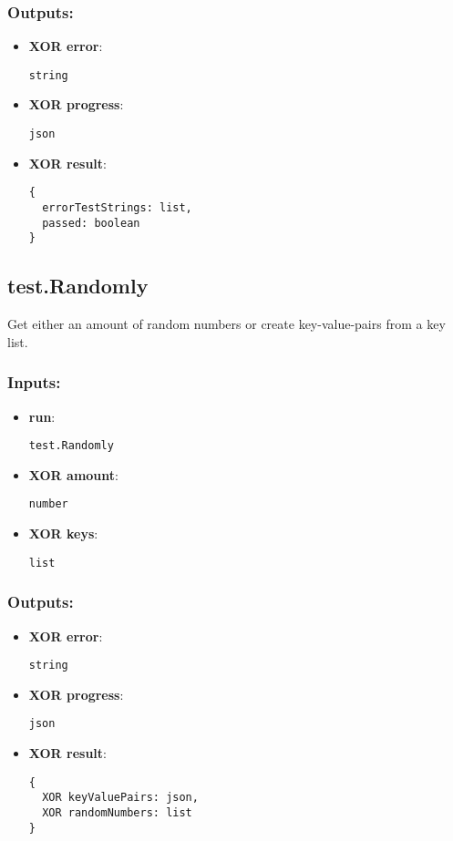 \subsubsection*{Outputs:}
\begin{itemize}
    \item \textbf{XOR error}: 
\begin{lstlisting}
string
\end{lstlisting}
    \item \textbf{XOR progress}: 
\begin{lstlisting}
json
\end{lstlisting}
    \item \textbf{XOR result}: 
\begin{lstlisting}
{
  errorTestStrings: list, 
  passed: boolean
}
\end{lstlisting}
  \end{itemize}

\subsection{test.Randomly}
\label{ch:builtinservices:test.Randomly}
Get either an amount of random numbers or create key-value-pairs from a key list.
\subsubsection*{Inputs:}
\begin{itemize}
    \item \textbf{run}: 
\begin{lstlisting}
test.Randomly
\end{lstlisting}
    \item \textbf{XOR amount}: 
\begin{lstlisting}
number
\end{lstlisting}
    \item \textbf{XOR keys}: 
\begin{lstlisting}
list
\end{lstlisting}
  \end{itemize}

\subsubsection*{Outputs:}
\begin{itemize}
    \item \textbf{XOR error}: 
\begin{lstlisting}
string
\end{lstlisting}
    \item \textbf{XOR progress}: 
\begin{lstlisting}
json
\end{lstlisting}
    \item \textbf{XOR result}: 
\begin{lstlisting}
{
  XOR keyValuePairs: json, 
  XOR randomNumbers: list
}
\end{lstlisting}
  \end{itemize}

